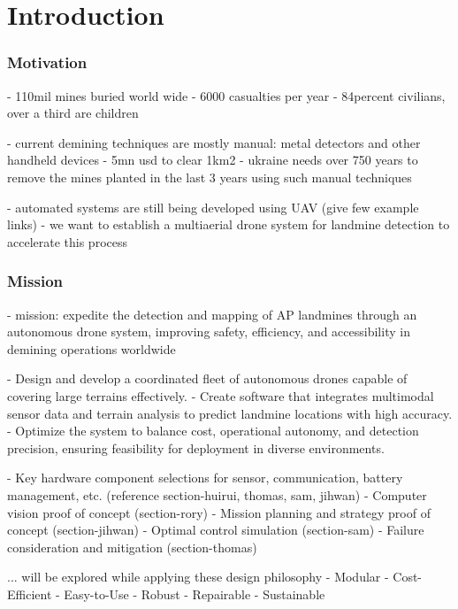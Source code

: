 \section{Introduction} \label{introduction}

\subsubsection{Motivation}

- 110mil mines buried world wide
- 6000 casualties per year
- 84percent civilians, over a third are children

- current demining techniques are mostly manual: metal detectors and other handheld devices
- 5mn usd to clear 1km2
- ukraine needs over 750 years to remove the mines planted in the last 3 years using such manual techniques

- automated systems are still being developed using UAV (give few example links)
- we want to establish a multiaerial drone system for landmine detection to accelerate this process

\subsubsection{Mission}

- mission: expedite the detection and mapping of AP landmines through an autonomous drone system, improving safety, efficiency, and accessibility in demining operations worldwide

- Design and develop a coordinated fleet of autonomous drones capable of covering large terrains effectively.
- Create software that integrates multimodal sensor data and terrain analysis to predict landmine locations with high accuracy.
- Optimize the system to balance cost, operational autonomy, and detection precision, ensuring feasibility for deployment in diverse environments.

- Key hardware component selections for sensor, communication, battery management, etc. (reference section-huirui, thomas, sam, jihwan)
- Computer vision proof of concept (section-rory)
- Mission planning and strategy proof of concept (section-jihwan)
- Optimal control simulation (section-sam)
- Failure consideration and mitigation (section-thomas)

... will be explored while applying these design philosophy
- Modular
- Cost-Efficient
- Easy-to-Use
- Robust
- Repairable
- Sustainable
